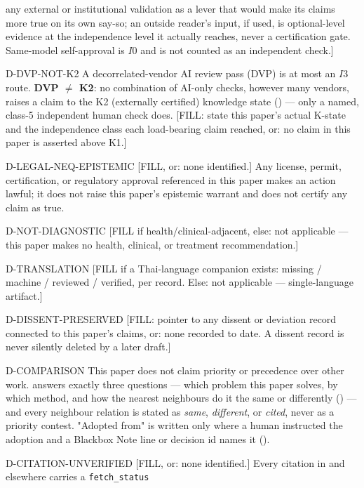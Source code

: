 \begin{disclaimers}
    any external or institutional validation as a lever that would make its
    claims more true on its own say-so; an outside reader's input, if used,
    is optional-level evidence at the independence level it actually reaches,
    never a certification gate. Same-model self-approval is \(I0\) and is not
    counted as an independent check.]
  \item[D-DVP-NOT-K2] A decorrelated-vendor AI review pass (DVP) is at most
    an \(I3\) route. \textbf{DVP $\neq$ K2}: no combination of AI-only
    checks, however many vendors, raises a claim to the K2 (externally
    certified) knowledge state () --- only a named, class-5
    independent human check does. [FILL: state this paper's actual K-state
    and the independence class each load-bearing claim reached, or: no
    claim in this paper is asserted above K1.]
  \item[D-LEGAL-NEQ-EPISTEMIC] [FILL, or: none identified.] Any license,
    permit, certification, or regulatory approval referenced in this paper
    makes an action lawful; it does not raise this paper's epistemic warrant
    and does not certify any claim as true.
  \item[D-NOT-DIAGNOSTIC] [FILL if health/clinical-adjacent, else: not
    applicable --- this paper makes no health, clinical, or treatment
    recommendation.]
  \item[D-TRANSLATION] [FILL if a Thai-language companion exists: missing /
    machine / reviewed / verified, per record. Else: not applicable ---
    single-language artifact.]
  \item[D-DISSENT-PRESERVED] [FILL: pointer to any dissent or deviation
    record connected to this paper's claims, or: none recorded to date. A
    dissent record is never silently deleted by a later draft.]
  \item[D-COMPARISON] This paper does not claim priority or precedence over
    other work.  answers exactly three questions --- which
    problem this paper solves, by which method, and how the nearest
    neighbours do it the same or differently () --- and
    every neighbour relation is stated as \emph{same}, \emph{different}, or
    \emph{cited}, never as a priority contest. "Adopted from" is written only
    where a human instructed the adoption and a Blackbox Note line or
    decision id names it ().
  \item[D-CITATION-UNVERIFIED] [FILL, or: none identified.] Every citation in
     and elsewhere carries a \texttt{fetch\_status}

\end{disclaimers}
